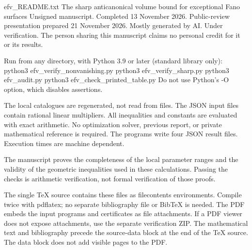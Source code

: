\documentclass[12pt,a4paper]{article}
\numberwithin{equation}{section}
\theoremstyle{definition}
\begin{document}
\begin{filecontents*}[overwrite]{efv_README.txt}
The sharp anticanonical volume bound for exceptional Fano surfaces
Unsigned manuscript. Completed 13 November 2026.
Public-review presentation prepared 21 November 2026.
Mostly generated by AI. Under verification.
The person sharing this manuscript claims no personal credit for it or its results.

Run from any directory, with Python 3.9 or later (standard library only):
  python3 efv_verify_nonvanishing.py
  python3 efv_verify_sharp.py
  python3 efv_audit.py
  python3 efv_check_printed_table.py
Do not use Python's -O option, which disables assertions.

The local catalogues are regenerated, not read from files.
The JSON input files contain rational linear multipliers.
All inequalities and constants are evaluated with exact arithmetic.
No optimization solver, previous report, or private mathematical reference is required.
The programs write four JSON result files. Execution times are machine dependent.

The manuscript proves the completeness of the local parameter ranges and
the validity of the geometric inequalities used in these calculations.
Passing the checks is arithmetic verification, not formal verification of those proofs.

The single TeX source contains these files as filecontents environments.
Compile twice with pdflatex; no separate bibliography file or BibTeX is needed.
The PDF embeds the input programs and certificates as file attachments.
If a PDF viewer does not expose attachments, use the separate verification ZIP.
The mathematical text and bibliography precede the source-data block at the
end of the TeX source. The data block does not add visible pages to the PDF.
\end{filecontents*}
\end{document}
